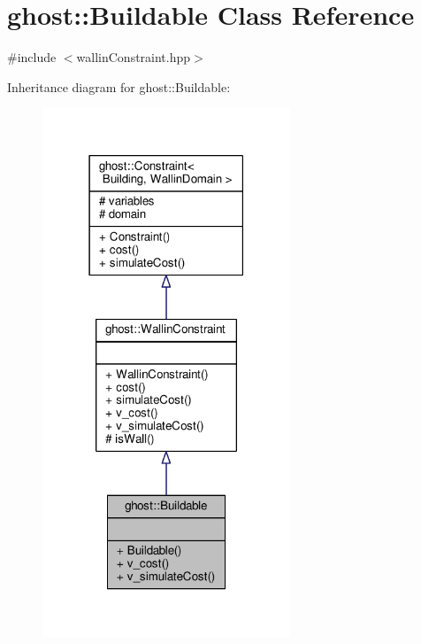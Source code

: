 \hypertarget{classghost_1_1Buildable}{\section{ghost\-:\-:Buildable Class Reference}
\label{classghost_1_1Buildable}
}


{\ttfamily \#include $<$wallin\-Constraint.\-hpp$>$}



Inheritance diagram for ghost\-:\-:Buildable\-:\nopagebreak
\begin{figure}[H]
\begin{center}
\leavevmode
\includegraphics[width=210pt]{classghost_1_1Buildable__inherit__graph}
\end{center}
\end{figure}


